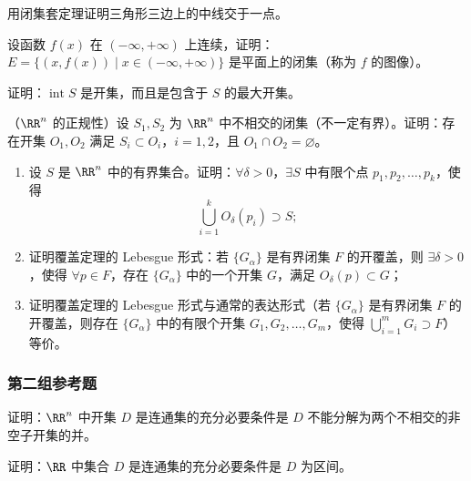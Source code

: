 \begin{xreferenceproblem}[2]
用闭集套定理证明三角形三边上的中线交于一点。
\end{xreferenceproblem}

\begin{xreferenceproblem}[3]
设函数 $f(x)$ 在 $(-\infty,+\infty)$ 上连续，证明：$E=\{(x,f(x))\mid x\in(-\infty,+\infty)\}$ 是平面上的闭集（称为 $f$ 的图像）。
\end{xreferenceproblem}

\begin{xreferenceproblem}[4]
证明：$\operatorname{int}S$ 是开集，而且是包含于 $S$ 的最大开集。
\end{xreferenceproblem}

\begin{xreferenceproblem}[5]
（$\RR^n$ 的正规性）设 $S_1,S_2$ 为 $\RR^n$ 中不相交的闭集（不一定有界）。证明：存在开集 $O_1,O_2$ 满足 $S_i\subset O_i$，$i=1,2$，且 $O_1\cap O_2=\varnothing$。
\end{xreferenceproblem}

\begin{xreferenceproblem}[6]
\begin{enumerate}[label=(\arabic*)]
    \item 设 $S$ 是 $\RR^n$ 中的有界集合。证明：$\forall\delta>0$，$\exists S$ 中有限个点 $p_1,p_2,\ldots,p_k$，使得
    \[
      \bigcup_{i=1}^kO_\delta(p_i)\supset S;
    \]
    \item 证明覆盖定理的 Lebesgue 形式：若 $\{G_\alpha\}$ 是有界闭集 $F$ 的开覆盖，则 $\exists\delta>0$，使得 $\forall p\in F$，存在 $\{G_\alpha\}$ 中的一个开集 $G$，满足 $O_\delta(p)\subset G$；
    \item 证明覆盖定理的 Lebesgue 形式与通常的表达形式（若 $\{G_\alpha\}$ 是有界闭集 $F$ 的开覆盖，则存在 $\{G_\alpha\}$ 中的有限个开集 $G_1,G_2,\ldots,G_m$，使得 $\bigcup_{i=1}^mG_i\supset F$）等价。
  \end{enumerate}
\end{xreferenceproblem}

\subsubsection*{第二组参考题}
\begin{xreferenceproblem}[1]
证明：$\RR^n$ 中开集 $D$ 是连通集的充分必要条件是 $D$ 不能分解为两个不相交的非空子开集的并。
\end{xreferenceproblem}

\begin{xreferenceproblem}[2]
证明：$\RR$ 中集合 $D$ 是连通集的充分必要条件是 $D$ 为区间。
\end{xreferenceproblem}

